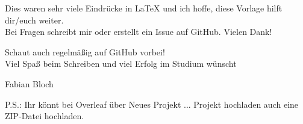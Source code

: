 Dies waren sehr viele Eindrücke in \LaTeX{} und ich hoffe, diese Vorlage hilft dir/euch weiter.\\

Bei Fragen schreibt mir oder erstellt ein Issue auf GitHub. Vielen Dank!

Schaut auch regelmäßig auf GitHub vorbei!\\

Viel Spaß beim Schreiben und viel Erfolg im Studium wünscht

Fabian Bloch

\vspace{15mm}
\textcolor{HCU}{P.S.: Ihr könnt bei Overleaf über \glqq Neues Projekt ... Projekt hochladen\grqq{} auch eine ZIP-Datei hochladen.}